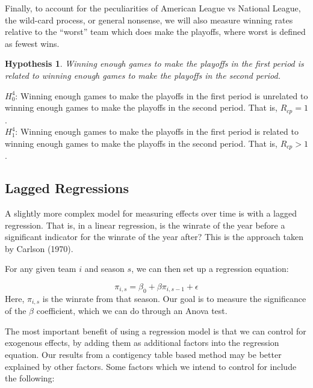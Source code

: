 \documentclass[11pt,]{scrartcl}
\newtheorem{hypothesis}{Hypothesis}
\begin{document}
Finally, to account for the peculiarities of American League vs National
League, the wild-card process, or general nonsense, we will also measure
winning rates relative to the ``worst'' team which does make the
playoffs, where worst is defined as fewest wins.

\begin{framed}
\begin{hypothesis}
Winning enough games to make the playoffs in the first period is related to winning enough games to make the playoffs in the second period.
\end{hypothesis}

\noindent $H_{0}^4$: Winning enough games to make the playoffs in the first period is unrelated to winning enough games to make the playoffs in the second period. That is, $R_{cp} = 1$.  \\
$H_{1}^4$: Winning enough games to make the playoffs in the first period is related to winning enough games to make the playoffs in the second period. That is, $R_{cp} > 1$. 
\end{framed}

\subsection{Lagged Regressions}\label{lagged-regressions}

A slightly more complex model for measuring effects over time is with a
lagged regression. That is, in a linear regression, is the winrate of
the year before a significant indicator for the winrate of the year
after? This is the approach taken by Carlson (1970).

For any given team \(i\) and season \(s\), we can then set up a
regression equation:

\[\pi_{i,s} = \beta_0 + \beta \pi_{i, s-1} + \epsilon\] Here,
\(\pi_{i,s}\) is the winrate from that season. Our goal is to measure
the significance of the \(\beta\) coefficient, which we can do through
an Anova test.

The most important benefit of using a regression model is that we can
control for exogenous effects, by adding them as additional factors into
the regression equation. Our results from a contigency table based
method may be better explained by other factors. Some factors which we
intend to control for include the following:
\end{document}
